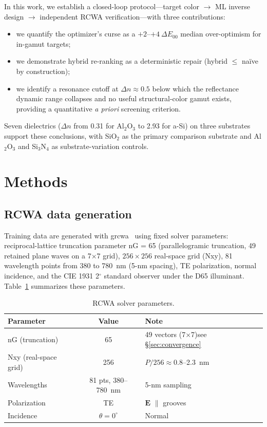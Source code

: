 \documentclass[10pt,twocolumn]{article}
\begin{document}
In this work, we establish a closed-loop protocol---target color $\to$ ML inverse design $\to$ independent RCWA verification---with three contributions:
\begin{itemize}
\item we quantify the optimizer's curse as a $+2$--$+4\ \Delta E_{00}$ median over-optimism for in-gamut targets;
\item we demonstrate hybrid re-ranking as a deterministic repair (hybrid $\le$ na\"ive by construction);
\item we identify a resonance cutoff at $\Delta n \approx 0.5$ below which the reflectance dynamic range collapses and no useful structural-color gamut exists, providing a quantitative \textit{a priori} screening criterion.
\end{itemize}
Seven dielectrics ($\Delta n$ from 0.31 for Al$_2$O$_3$ to 2.93 for a-Si) on three substrates support these conclusions, with SiO$_2$ as the primary comparison substrate and Al$_2$O$_3$ and Si$_3$N$_4$ as substrate-variation controls.

\section{Methods}

\subsection{RCWA data generation}

Training data are generated with grcwa~\cite{ref17} using fixed solver parameters: reciprocal-lattice truncation parameter nG = 65 (parallelogramic truncation, 49 retained plane waves on a 7$\times$7 grid), $256 \times 256$ real-space grid (Nxy), 81 wavelength points from 380 to 780~nm (5-nm spacing), TE polarization, normal incidence, and the CIE 1931 2$^\circ$ standard observer under the D65 illuminant. Table~\ref{tab:rcwa} summarizes these parameters.

\begin{table}[!t]
\centering
\caption{RCWA solver parameters.}
\footnotesize
\label{tab:rcwa}
\begin{tabular}{@{}lcp{2.4cm}@{}}
\toprule
Parameter & Value & Note \\
\midrule
nG (truncation) & 65 & 49 vectors (7$\times$7)\newline see \S\ref{sec:convergence} \\
Nxy (real-space grid) & 256 & $P/256 \approx 0.8$--2.3~nm \\
Wavelengths & 81 pts, 380--780~nm & 5-nm sampling \\
Polarization & TE & $\mathbf{E}$ $\|$ grooves \\
Incidence & $\theta = 0^\circ$ & Normal \\
\bottomrule
\end{tabular}
\end{table}
\end{document}
